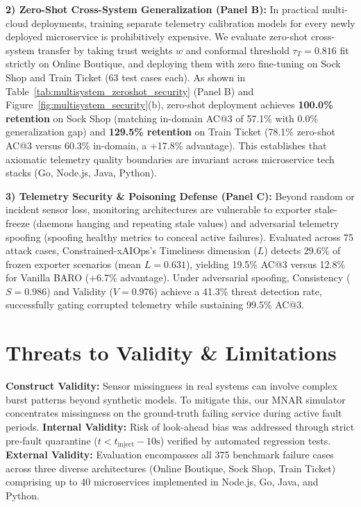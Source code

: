 \documentclass[conference]{IEEEtran}
\begin{document}
\textbf{2) Zero-Shot Cross-System Generalization (Panel B):} In practical multi-cloud deployments, training separate telemetry calibration models for every newly deployed microservice is prohibitively expensive. We evaluate zero-shot cross-system transfer by taking trust weights $w$ and conformal threshold $\tau_T = 0.816$ fit strictly on Online Boutique, and deploying them with zero fine-tuning on Sock Shop and Train Ticket (63 test cases each). As shown in Table~\ref{tab:multisystem_zeroshot_security} (Panel B) and Figure~\ref{fig:multisystem_security}(b), zero-shot deployment achieves \textbf{100.0\% retention} on Sock Shop (matching in-domain AC@3 of 57.1\% with 0.0\% generalization gap) and \textbf{129.5\% retention} on Train Ticket (78.1\% zero-shot AC@3 versus 60.3\% in-domain, a +17.8\% advantage). This establishes that axiomatic telemetry quality boundaries are invariant across microservice tech stacks (Go, Node.js, Java, Python).

\textbf{3) Telemetry Security \& Poisoning Defense (Panel C):} Beyond random or incident sensor loss, monitoring architectures are vulnerable to exporter stale-freeze (daemons hanging and repeating stale values) and adversarial telemetry spoofing (spoofing healthy metrics to conceal active failures). Evaluated across 75 attack cases, Constrained-xAIOps's Timeliness dimension ($L$) detects 29.6\% of frozen exporter scenarios (mean $L=0.631$), yielding 19.5\% AC@3 versus 12.8\% for Vanilla BARO (+6.7\% advantage). Under adversarial spoofing, Consistency ($S=0.986$) and Validity ($V=0.976$) achieve a 41.3\% threat detection rate, successfully gating corrupted telemetry while sustaining 99.5\% AC@3.

\section{Threats to Validity \& Limitations}
\textbf{Construct Validity:} Sensor missingness in real systems can involve complex burst patterns beyond synthetic models. To mitigate this, our MNAR simulator concentrates missingness on the ground-truth failing service during active fault periods.
\textbf{Internal Validity:} Risk of look-ahead bias was addressed through strict pre-fault quarantine ($t < t_{\text{inject}} - 10\text{s}$) verified by automated regression tests.
\textbf{External Validity:} Evaluation encompasses all 375 benchmark failure cases across three diverse architectures (Online Boutique, Sock Shop, Train Ticket) comprising up to 40 microservices implemented in Node.js, Go, Java, and Python.
\end{document}
